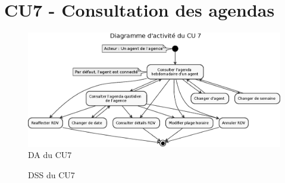 \section{CU7 - Consultation des agendas}
\begin{figure}[H]
\centering
\includegraphics[width=20cm, angle=90]{figures/eps/DA_CU7.eps}
\caption{DA du CU7}
\end{figure}


\begin{figure}[H]
\noindent{}
\caption{DSS du CU7}
\end{figure}

